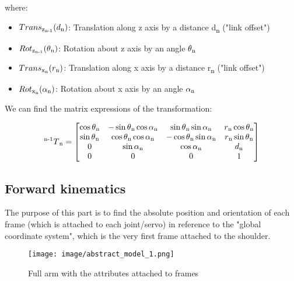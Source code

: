 \documentclass[conference]{IEEEtran}
\def\SP#1{\textsuperscript{\textcolor{black}{#1}}}
\def\SB#1{\textsubscript{\textcolor{black}{#1}}}
\begin{document}
  where:
  \begin{itemize}
  	\item $Trans\SB{z\SB{n-1}}(d\SB{n})$: Translation along z axis by a distance d\SB{n} ("link offset")
  	\item $Rot\SB{z\SB{n-1}}(\theta\SB{n})$: Rotation about z axis by an angle $\theta\SB{n}$
  	\item $Trans\SB{x\SB{n}}(r\SB{n})$: Translation along x axis by a distance r\SB{n} ("link offset")
  	\item $Rot\SB{x\SB{n}}(\alpha\SB{n})$: Rotation about x axis by an angle $\alpha\SB{n}$
  \end{itemize}
  
  We can find the matrix expressions of the transformation:
  
  \begin{center}
  	\begin{equation} \label{eqt:dh_matrix}
  	\SP{n-1}T\SB{n} =
  	\begin{bmatrix}
  	\cos{\theta\SB{n}} & -\sin{\theta\SB{n}}\cos{\alpha\SB{n}} & \sin{\theta\SB{n}}\sin{\alpha\SB{n}} & r\SB{n}\cos{\theta\SB{n}}\\
  	\sin{\theta\SB{n}} & \cos{\theta\SB{n}}\cos{\alpha\SB{n}} & -\cos{\theta\SB{n}}\sin{\alpha\SB{n}} & r\SB{n}\sin{\theta\SB{n}}\\
  	0 & \sin{\alpha\SB{n}} & \cos{\alpha\SB{n}} & d\SB{n}\\
  	0 & 0 & 0 & 1
  	\end{bmatrix}
  	\end{equation}
  \end{center}

\subsection{Forward kinematics}
  The purpose of this part is to find the absolute position and orientation of each frame (which is attached to each joint/servo) in reference to the "global coordinate system", which is the very first frame attached to the shoulder.
  
  \begin{figure}[H]
  	\centering
  	\texttt{[image: image/abstract\_model\_1.png]}
  	\caption{Full arm with the attributes attached to frames}
  	\label{fig:arm_attributes}
  \end{figure}
  
\end{document}
